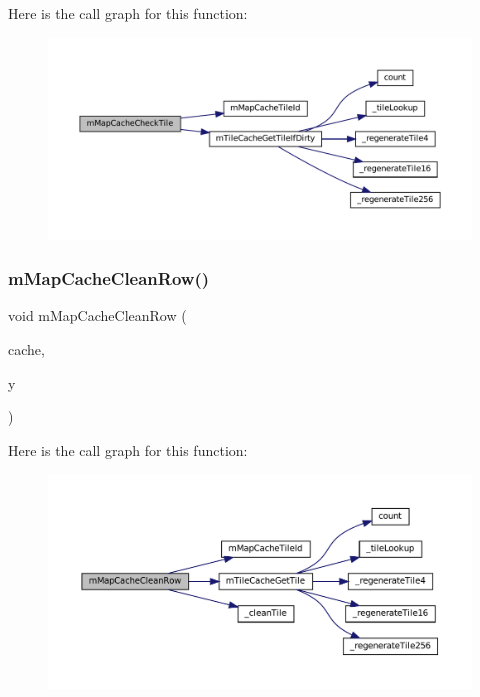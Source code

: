 Here is the call graph for this function\+:
\nopagebreak
\begin{figure}[H]
\begin{center}
\leavevmode
\includegraphics[width=350pt]{map-cache_8c_a15867a8857e1045680838b22ad9ccc61_cgraph}
\end{center}
\end{figure}
\mbox{\label{map-cache_8c_a0a1c74da99590ece390c102cb8b9b742}} 
\subsubsection{\texorpdfstring{m\+Map\+Cache\+Clean\+Row()}{mMapCacheCleanRow()}}
{\footnotesize\ttfamily void m\+Map\+Cache\+Clean\+Row (\begin{DoxyParamCaption}\item[{struct m\+Map\+Cache $\ast$}]{cache,  }\item[{unsigned}]{y }\end{DoxyParamCaption})}

Here is the call graph for this function\+:
\nopagebreak
\begin{figure}[H]
\begin{center}
\leavevmode
\includegraphics[width=350pt]{map-cache_8c_a0a1c74da99590ece390c102cb8b9b742_cgraph}
\end{center}
\end{figure}
\mbox{\label{map-cache_8c_abccd8ab5a0dafd34ed2be822edc14af6}} 
